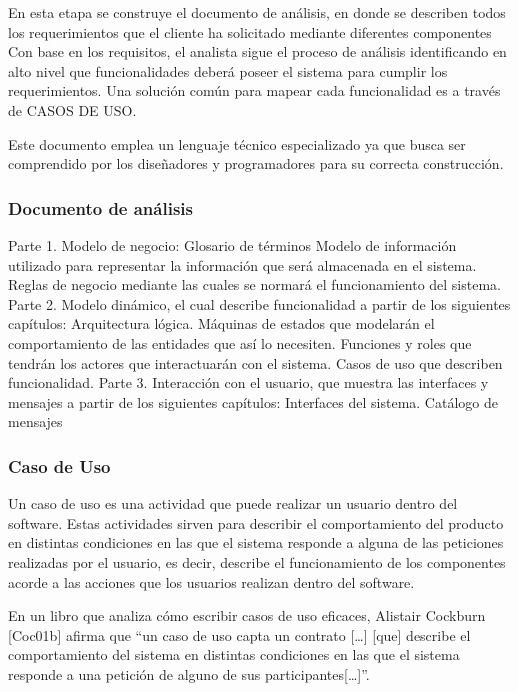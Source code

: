 \bigskip

En esta etapa se construye el documento de análisis, en donde se describen todos los requerimientos que el cliente ha solicitado mediante diferentes componentes
Con base en los requisitos, el analista sigue el proceso de análisis identificando en alto nivel que funcionalidades deberá poseer el sistema para cumplir los requerimientos. Una solución común para mapear cada funcionalidad es a través de CASOS DE USO.

Este documento emplea un lenguaje técnico especializado ya que busca ser comprendido por los diseñadores y programadores para su correcta construcción.

\subsubsection{Documento de análisis}

Parte 1. Modelo de negocio:
Glosario de términos
Modelo de información utilizado para representar la información que será almacenada en el sistema.
Reglas de negocio mediante las cuales se normará el funcionamiento del sistema.
Parte 2. Modelo dinámico, el cual describe funcionalidad a partir de los siguientes capítulos:
Arquitectura lógica.
Máquinas de estados que modelarán el comportamiento de las entidades que así lo necesiten.
Funciones y roles que tendrán los actores que interactuarán con el sistema.
Casos de uso que describen funcionalidad.
Parte 3. Interacción con el usuario, que muestra las interfaces y mensajes a partir de los siguientes
capítulos:
Interfaces del sistema.
Catálogo de mensajes

\subsubsection{Caso de Uso}

Un caso de uso es una actividad que puede realizar un usuario dentro del software. Estas actividades sirven para describir el comportamiento del producto en distintas condiciones en las que el sistema responde a alguna de las peticiones realizadas por el usuario, es decir, describe el funcionamiento de los componentes acorde a las acciones que los usuarios realizan dentro del software.

En un libro que analiza cómo escribir casos de uso eficaces, Alistair Cockburn [Coc01b] afirma que “un caso de uso capta un contrato […] [que] describe el comportamiento del sistema en distintas condiciones en las que el sistema responde a una petición de alguno de sus participantes[…]”.

